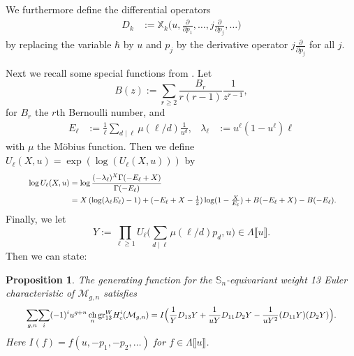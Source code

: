\documentclass[12pt]{amsart}
\newtheorem{prop}[thm]{Proposition}
\theoremstyle{definition}
\numberwithin{equation}{section}
\renewcommand{\ss}{\mathbb{S}}
\newcommand{\M}{\mathcal{M}}
\DeclareMathOperator{\ch}{ch}
\theoremstyle{definition} %
\theoremstyle{remark}
\newcommand{\gr}{\mathrm{gr}}
\begin{document}
\medskip 

We furthermore define the differential operators 
\begin{align*}
    D_{k} &:= \mathbb{X}_k\Big(u, \frac{\partial}{\partial p_1}, \dots, j \frac{\partial}{\partial p_j },\dots\Big)
\end{align*}
by replacing the variable $\hbar$ by $u$ and $p_j$ by the derivative operator $j\frac{\partial}{\partial p_j}$ for all $j$.

Next we recall some special functions from \cite{PayneWillwacher24b}.
Let 
\begin{equation*}
    B(z) := \sum_{r\geq 2}\frac{B_r}{r(r-1)} \frac 1 {z^{r-1}},
  \end{equation*}
for $B_r$ the $r$th Bernoulli number,  and 
  \begin{align*}
    E_\ell&:= \frac 1 \ell \sum_{d\mid \ell}\mu(\ell/d)\frac 1 {u^d},
    &
    \lambda_\ell &:= u^\ell (1-u^\ell)\ell
\end{align*}
with $\mu$ the M\"obius function. 
Then we define 
$U_\ell(X, u)=\exp(\log(U_\ell(X,u)))$
 by
\begin{equation} \label{equ:Uelldef} 
\resizebox{.92\hsize}{!}{
$\begin{aligned}
    \log U_\ell(X,u) 
   &=   
    \log \frac {(-\lambda_\ell)^X \Gamma(-E_\ell+X) }{\Gamma(-E_\ell)}
  \\&=
        X\left(\log(\lambda_\ell E_\ell)-1 \right)+(-E_\ell+X-\textstyle{\frac 1 2} )\log(1-\textstyle{\frac X{E_\ell}}) +
         B(-E_\ell+X)- B(-E_\ell). 
         \end{aligned}
          $}
\end{equation}
Finally, we let
\[
Y:= \prod_{\ell\geq 1} U_\ell\big(\sum_{d\mid \ell}\mu(\ell/d) p_d,u\big)
\in \Lambda\llbracket u \rrbracket.
\]
Then we can state:
\begin{prop}
The generating function for the $\ss_n$-equivariant weight 13 Euler characteristic of $\M_{g,n}$ satisfies 
\begin{equation}\label{equ:chi 13}
\resizebox{.92\hsize}{!}{$
\displaystyle{\sum_{g,n}}\displaystyle{\sum_i} (-1)^i
u^{g+n} \ch_n \gr_{13}^W H^i_c(\M_{g,n}) 
=
I\Big(
\frac 1Y D_{13} Y + 
\frac 1{uY} D_{11} D_2 Y
- 
\frac 1{u Y^2} (D_{11} Y) (D_2 Y)
\Big).$}
\end{equation}
Here $I(f)=f(u,-p_1,-p_2,\dots)$ for $f\in \Lambda\llbracket u\rrbracket$.
\end{prop}
\end{document}
